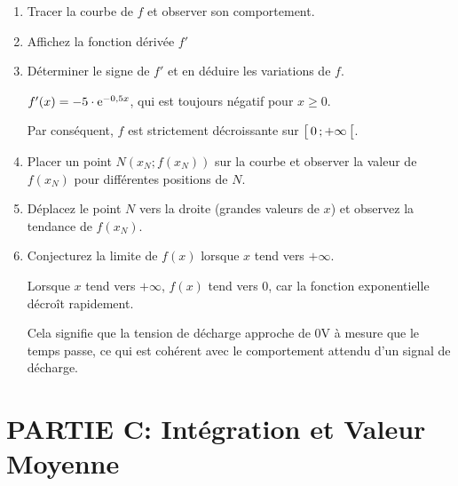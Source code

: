 \documentclass[11pt, a4paper]{report}
\begin{document}
\begin{enumerate}[resume]
    \item Tracer la courbe de $f$ et observer son comportement.  
    \item Affichez la fonction dérivée $f'$   
    \item Déterminer le signe de $f'$ et en déduire les variations de $f$.  
    \begin{blocvisible}[height=4]
        \begin{minipage}{0.54\linewidth}
            $f'(x) = -5\cdot \mathrm{e}^{-0,5x}$, qui est toujours négatif pour $x \geq 0$.

            Par conséquent, $f$ est strictement décroissante sur $\bigl[ \, 0 \, ; +\infty \,\bigl[$.
        \end{minipage}\hfill
        \begin{minipage}{0.45\linewidth}
        \end{minipage}
    \end{blocvisible}
        
    \item Placer un point $N\left(x_N; f(x_N)\right)$ sur la courbe et observer la valeur de $f(x_N)$ pour différentes positions de $N$.   
    \item Déplacez le point $N$ vers la droite (grandes valeurs de $x$) et observez la tendance de $f(x_N)$.  
    \item Conjecturez la limite de $f(x)$ lorsque $x$ tend vers $+\infty$.   
    
    \begin{blocvisible}[height=2]
        Lorsque $x$ tend vers $+\infty$, $f(x)$ tend vers 0, car la fonction exponentielle décroît rapidement.

        Cela signifie que la tension de décharge approche de 0V à mesure que le temps passe, ce qui est cohérent avec le comportement attendu d'un signal de décharge.
    \end{blocvisible}
\end{enumerate}

\section*{PARTIE C\@: Intégration et Valeur Moyenne}
\end{document}
